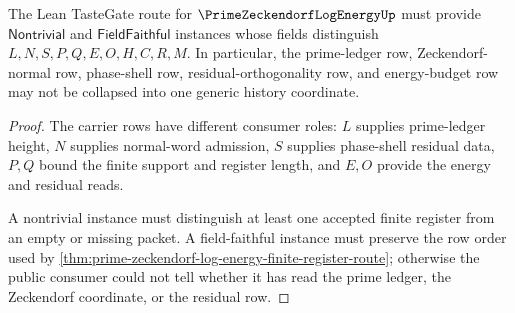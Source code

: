 \begin{theorem}
\label{thm:prime-zeckendorf-log-energy-tastegate-obligation}
The Lean TasteGate route for $\PrimeZeckendorfLogEnergyUp$ must provide $\mathsf{Nontrivial}$ and $\mathsf{FieldFaithful}$ instances whose fields distinguish $L,N,S,P,Q,E,O,H,C,R,M$. In particular, the prime-ledger row, Zeckendorf-normal row, phase-shell row, residual-orthogonality row, and energy-budget row may not be collapsed into one generic history coordinate.
\end{theorem}
\begin{proof}
The carrier rows have different consumer roles: $L$ supplies prime-ledger height, $N$ supplies normal-word admission, $S$ supplies phase-shell residual data, $P,Q$ bound the finite support and register length, and $E,O$ provide the energy and residual reads.

A nontrivial instance must distinguish at least one accepted finite register from an empty or missing packet. A field-faithful instance must preserve the row order used by \autoref{thm:prime-zeckendorf-log-energy-finite-register-route}; otherwise the public consumer could not tell whether it has read the prime ledger, the Zeckendorf coordinate, or the residual row.
\end{proof}





